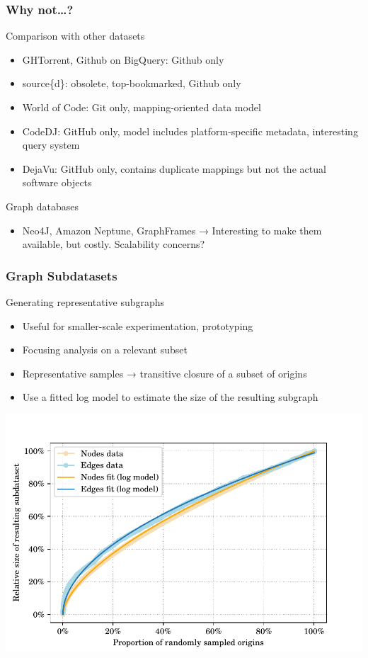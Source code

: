 \documentclass[aspectratio=169,xcolor=table]{beamer}
\begin{document}
    \begin{frame}
        \frametitle{Why not…?}
        \begin{block}{Comparison with other datasets}
            \begin{itemize}
                \item GHTorrent, Github on BigQuery: Github only
                \item source\{d\}: obsolete, top-bookmarked, Github only
                \item World of Code: Git only, mapping-oriented data model
                \item CodeDJ: GitHub only, model includes platform-specific
                    metadata, interesting query system
                \item DejaVu: GitHub only, contains duplicate mappings but not
                    the actual software objects
            \end{itemize}
        \end{block}
        \begin{block}{Graph databases}
            \begin{itemize}
                \item Neo4J, Amazon Neptune, GraphFrames → Interesting to
                    make them available, but costly. Scalability concerns?
            \end{itemize}
        \end{block}
    \end{frame}

    \begin{frame}
        \frametitle{Graph Subdatasets}

        \begin{block}{Generating representative subgraphs}
            \begin{itemize}
                \item Useful for smaller-scale experimentation, prototyping
                \item Focusing analysis on a relevant subset
                \item Representative samples → transitive closure of a subset
                    of origins
                \item Use a fitted log model to estimate the size of the
                    resulting subgraph
            \end{itemize}
        \end{block}

        \begin{center}
            \includegraphics[width=.5\linewidth]{../img/graph-exploitation/subdataset_size_function_fit.pdf}
        \end{center}
    \end{frame}
\end{document}
